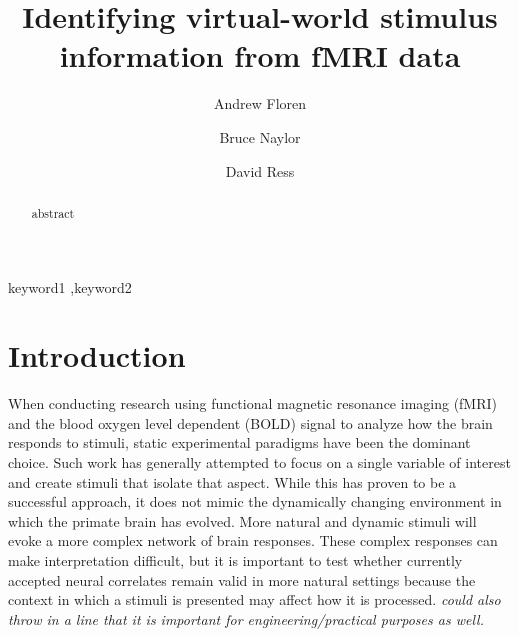\documentclass[preprint,5p,authoryear]{elsarticle}
\begin{document}
\begin{frontmatter}

\title{Identifying virtual-world stimulus information from fMRI data}

\author[UT]{Andrew Floren}

\author[UT]{Bruce Naylor}

\author[UT]{David Ress}

\address[UT]{The University of Texas at Austin, Austin, TX 78712 USA}


\begin{abstract}
abstract
\end{abstract}

\begin{keyword}
keyword1 \sep keyword2
\end{keyword}

\end{frontmatter}

\section{Introduction}
When conducting research using functional magnetic resonance imaging (fMRI) and the blood oxygen level dependent (BOLD) signal to analyze how the brain responds to stimuli, static experimental paradigms have been the dominant choice.
Such work has generally attempted to focus on a single variable of interest and create stimuli that isolate that aspect.
While this has proven to be a successful approach, it does not mimic the dynamically changing environment in which the primate brain has evolved.
More natural and dynamic stimuli will evoke a more complex network of brain responses.
These complex responses can make interpretation difficult, but it is important to test whether currently accepted neural correlates remain valid in more natural settings because the context in which a stimuli is presented may affect how it is processed.
\emph{could also throw in a line that it is important for engineering/practical purposes as well.}
\end{document}
